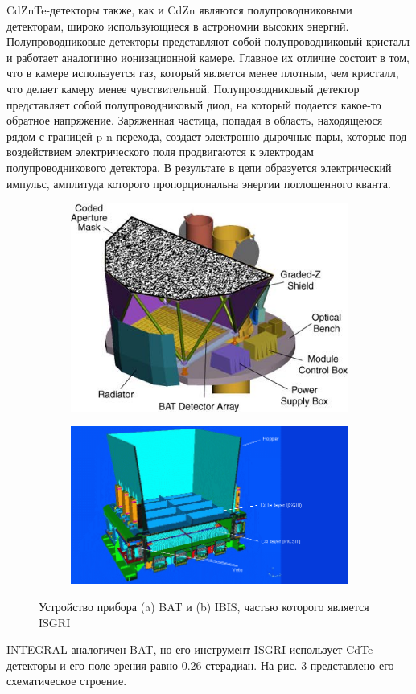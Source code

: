 	 CdZnTe-детекторы также, как и CdZn являются полупроводниковыми детекторам, широко использующиеся в астрономии высоких энергий. Полупроводниковые детекторы представляют собой полупроводниковый кристалл и работает аналогично ионизационной камере. Главное их отличие состоит в том, что в камере используется газ, который является менее плотным, чем кристалл, что делает камеру менее чувствительной. Полупроводниковый детектор представляет собой полупроводниковый диод, на который подается какое-то обратное напряжение. Заряженная частица, попадая в область, находящеюся рядом с границей p-n перехода, создает электронно-дырочные пары, которые под воздействием электрического поля продвигаются к электродам полупроводникового детектора. В результате в цепи образуется электрический импульс, амплитуда которого пропорциональна энергии поглощенного кванта.
	
	\begin{figure}[h!]
		\centering
			\begin{subfigure}[b]{0.40\linewidth}
			\includegraphics[width = \textwidth]{pictures/BAT.jpg}
			\caption{}
			\label{img:bat1}
		\end{subfigure}
		\begin{subfigure}[b]{0.40\linewidth}
		\centering
			\includegraphics[width = \textwidth]{pictures/INTEGRAL.png}
			\caption{}
			\label{img:int1}
		\end{subfigure}
		\caption{Устройство прибора (a) BAT и (b) IBIS, частью которого является ISGRI}
	\end{figure}
	
	INTEGRAL аналогичен BAT, но его инструмент ISGRI использует CdTe-детекторы и его поле зрения равно $0.26$ стерадиан. На рис. \ref{img:int1} представлено его схематическое строение. 